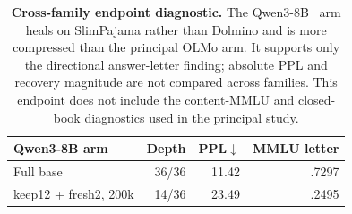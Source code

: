 \begin{table}[t]
\centering
\small
\setlength{\tabcolsep}{5pt}
\begin{tabular}{@{}lrrr@{}}
\toprule
\textbf{Qwen3-8B arm} & \textbf{Depth} & \textbf{PPL}$\downarrow$ & \textbf{MMLU letter} \\
\midrule
Full base & 36/36 & 11.42 & .7297 \\
keep12 + fresh2, 200k & 14/36 & 23.49 & .2495 \\
\bottomrule
\end{tabular}
\caption{\textbf{Cross-family endpoint diagnostic.} The Qwen3-8B~\citep{qwen3} arm heals on
SlimPajama rather than Dolmino and is more compressed than the principal OLMo
arm. It supports only the directional answer-letter finding; absolute PPL and
recovery magnitude are not compared across families. This endpoint does not
include the content-MMLU and closed-book diagnostics used in the principal study.}
\label{tab:app-crossfamily}
\end{table}

